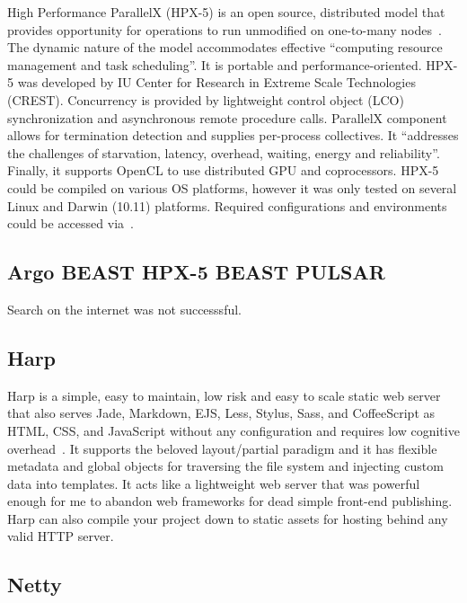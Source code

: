 High Performance ParallelX (HPX-5) is an open source, distributed
model that provides opportunity for operations to run unmodified on
one-to-many nodes~\cite{www-hpx-5}.  The dynamic nature of the model
accommodates effective ``computing resource management and task
scheduling''. It is portable and performance-oriented. HPX-5 was
developed by IU Center for Research in Extreme Scale Technologies
(CREST). Concurrency is provided by lightweight control object (LCO)
synchronization and asynchronous remote procedure calls. ParallelX
component allows for termination detection and supplies per-process
collectives. It ``addresses the challenges of starvation, latency,
overhead, waiting, energy and reliability''. Finally, it supports
OpenCL to use distributed GPU and coprocessors. HPX-5 could be
compiled on various OS platforms, however it was only tested on
several Linux and Darwin (10.11) platforms. Required configurations
and environments could be accessed via~\cite{www-hpx-5-user-guide}.

     \pv
	 
	 
\subsection{Argo BEAST HPX-5 BEAST PULSAR}

     Search on the internet was not successsful.
     
\subsection{Harp}

Harp is a simple, easy to maintain, low risk and easy to scale static
web server that also serves Jade, Markdown, EJS, Less, Stylus, Sass,
and CoffeeScript as HTML, CSS, and JavaScript without any
configuration and requires low cognitive overhead~\cite{www-harp}. It
supports the beloved layout/partial paradigm and it has flexible
metadata and global objects for traversing the file system and
injecting custom data into templates. It acts like a lightweight web
server that was powerful enough for me to abandon web frameworks for
dead simple front-end publishing. Harp can also compile your project
down to static assets for hosting behind any valid HTTP server.

     \pv
     
\subsection{Netty}

